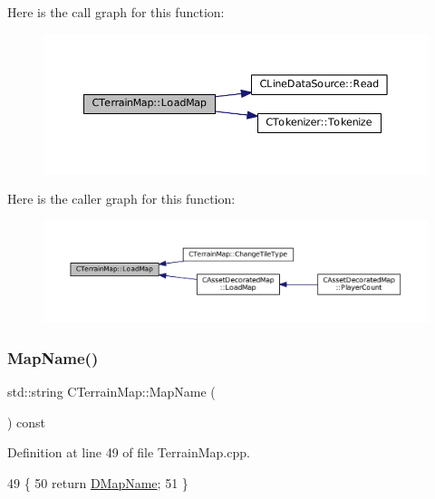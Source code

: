 Here is the call graph for this function\+:\nopagebreak
\begin{figure}[H]
\begin{center}
\leavevmode
\includegraphics[width=350pt]{classCTerrainMap_a620258ecf38afb6275c865dad4fc4af4_cgraph}
\end{center}
\end{figure}
Here is the caller graph for this function\+:\nopagebreak
\begin{figure}[H]
\begin{center}
\leavevmode
\includegraphics[width=350pt]{classCTerrainMap_a620258ecf38afb6275c865dad4fc4af4_icgraph}
\end{center}
\end{figure}
\hypertarget{classCTerrainMap_a2bdc91c2f8d16783992363ea16532dd7}{}\label{classCTerrainMap_a2bdc91c2f8d16783992363ea16532dd7} 
\subsubsection{\texorpdfstring{Map\+Name()}{MapName()}}
{\footnotesize\ttfamily std\+::string C\+Terrain\+Map\+::\+Map\+Name (\begin{DoxyParamCaption}{ }\end{DoxyParamCaption}) const}



Definition at line 49 of file Terrain\+Map.\+cpp.


\begin{DoxyCode}
49                                     \{
50     \textcolor{keywordflow}{return} \hyperlink{classCTerrainMap_a9026e4a5f073885b9e9fc3b43e93caa6}{DMapName};   
51 \}
\end{DoxyCode}
\hypertarget{classCTerrainMap_ad9f476d5d4db6de2907dfa3d4d9de7e6}{}\label{classCTerrainMap_ad9f476d5d4db6de2907dfa3d4d9de7e6} 
